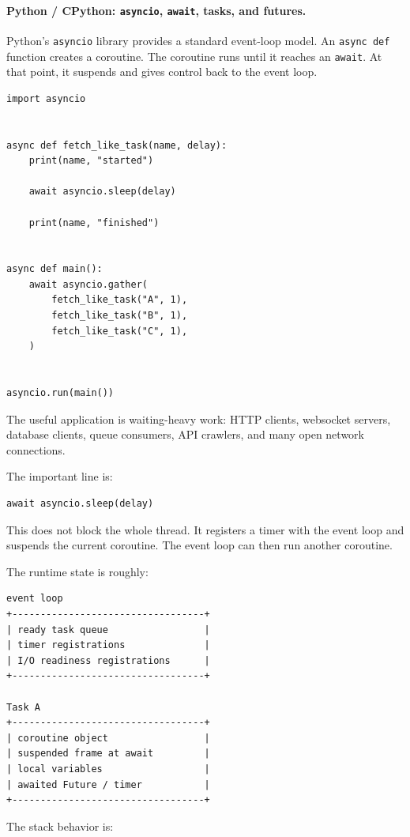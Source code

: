 \paragraph{Python / CPython: \texttt{asyncio}, \texttt{await}, tasks, and futures.}

Python's \texttt{asyncio} library provides a standard event-loop model. An \texttt{async def} function creates a coroutine. The coroutine runs until it reaches an \texttt{await}. At that point, it suspends and gives control back to the event loop.

\begin{verbatim}
import asyncio


async def fetch_like_task(name, delay):
    print(name, "started")

    await asyncio.sleep(delay)

    print(name, "finished")


async def main():
    await asyncio.gather(
        fetch_like_task("A", 1),
        fetch_like_task("B", 1),
        fetch_like_task("C", 1),
    )


asyncio.run(main())
\end{verbatim}

The useful application is waiting-heavy work: HTTP clients, websocket servers, database clients, queue consumers, API crawlers, and many open network connections.

The important line is:

\begin{verbatim}
await asyncio.sleep(delay)
\end{verbatim}

This does not block the whole thread. It registers a timer with the event loop and suspends the current coroutine. The event loop can then run another coroutine.

The runtime state is roughly:

\begin{verbatim}
event loop
+----------------------------------+
| ready task queue                 |
| timer registrations              |
| I/O readiness registrations      |
+----------------------------------+

Task A
+----------------------------------+
| coroutine object                 |
| suspended frame at await         |
| local variables                  |
| awaited Future / timer           |
+----------------------------------+
\end{verbatim}

The stack behavior is:

